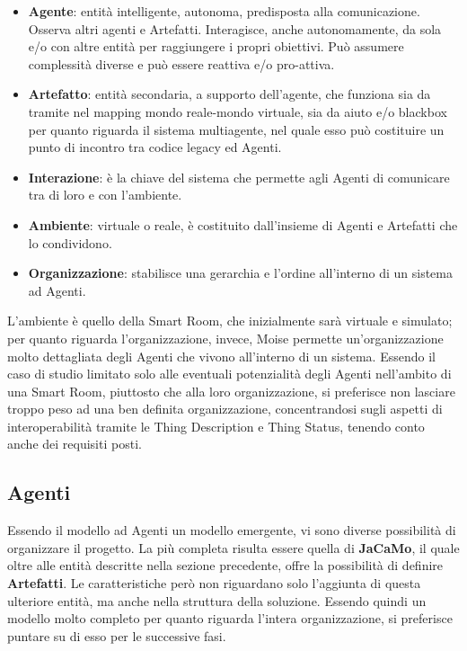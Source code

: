 \documentclass[12pt,a4paper,openright,oneside]{report}
\begin{document}
\begin{itemize}
	\item \textbf{Agente}: entità intelligente, autonoma, predisposta alla comunicazione. Osserva altri agenti e Artefatti. Interagisce, anche autonomamente, da sola e/o con altre entità per raggiungere i propri obiettivi. Può assumere complessità diverse e può essere reattiva e/o pro-attiva.
	
	\item \textbf{Artefatto}: entità secondaria, a supporto dell'agente, che funziona sia da tramite nel mapping mondo reale-mondo virtuale, sia da aiuto e/o blackbox per quanto riguarda il sistema multiagente, nel quale esso può costituire un punto di incontro tra codice legacy ed Agenti.
	
	\item \textbf{Interazione}: è la chiave del sistema che permette agli Agenti di comunicare tra di loro e con l'ambiente.
	
	\item \textbf{Ambiente}: virtuale o reale, è costituito dall'insieme di Agenti e Artefatti che lo condividono.
	
	\item \textbf{Organizzazione}: stabilisce una gerarchia e l'ordine all'interno di un sistema ad Agenti.
\end{itemize}

L'ambiente è quello della Smart Room, che inizialmente sarà virtuale e simulato; per quanto riguarda l'organizzazione, invece, Moise permette un'organizzazione molto dettagliata degli Agenti che vivono all'interno di un sistema. Essendo il caso di studio limitato solo alle eventuali potenzialità degli Agenti nell'ambito di una Smart Room, piuttosto che alla loro organizzazione, si preferisce non lasciare troppo peso ad una ben definita organizzazione, concentrandosi sugli aspetti di interoperabilità tramite le Thing Description e Thing Status, tenendo conto anche dei requisiti posti.\\

\subsection{Agenti}
Essendo il modello ad Agenti un modello emergente, vi sono diverse possibilità di organizzare il progetto. La più completa risulta essere quella di \textbf{JaCaMo}, il quale oltre alle entità descritte nella sezione precedente, offre la possibilità di definire \textbf{Artefatti}. Le caratteristiche però non riguardano solo l'aggiunta di questa ulteriore entità, ma anche nella struttura della soluzione. Essendo quindi un modello molto completo per quanto riguarda l'intera organizzazione, si preferisce puntare su di esso per le successive fasi.\\
\end{document}
